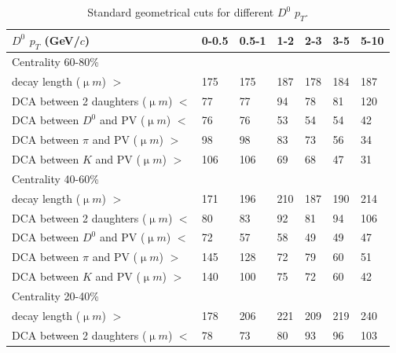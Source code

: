 \begin{table}[htp]
  \centering
  \caption{Standard geometrical cuts for different $D^0$ $p_T$.}
  \label{geometryCuts}
  \begin{center}
    \begin{tabular}{l|l|l|l|l|l|l}
      $D^0$ $p_T$ (GeV/$c$) & 0-0.5 & 0.5-1 & 1-2 & 2-3 & 3-5 & 5-10\\ \hline
      Centrality  60-80\% & &  & &  & & \\ \hline
      decay length (${\upmu}m$) $>$ & 175 & 175 & 187 & 178 & 184 & 187\\ \hline
      DCA between 2 daughters (${\upmu}m$) $<$ & 77 & 77 & 94 & 78 & 81 & 120\\ \hline
      DCA between $D^0$ and PV (${\upmu}m$) $<$ & 76 & 76 & 53 & 54 & 54 & 42\\ \hline
      DCA between $\pi$ and PV (${\upmu}m$) $>$ & 98 & 98 & 83 & 73 & 56 & 34\\ \hline
      DCA between $K$ and PV (${\upmu}m$) $>$ & 106 & 106 & 69 & 68 & 47 & 31\\ \hline
      Centrality  40-60\% &  &  &  &  & & \\ \hline
      decay length (${\upmu}m$) $>$ & 171 & 196 & 210 & 187 & 190 & 214\\ \hline
      DCA between 2 daughters (${\upmu}m$) $<$ & 80 & 83 & 92 & 81 & 94 & 106\\ \hline
      DCA between $D^0$ and PV (${\upmu}m$) $<$ & 72 & 57 & 58 & 49 & 49 & 47\\ \hline
      DCA between $\pi$ and PV (${\upmu}m$) $>$ & 145 & 128 & 72 & 79 & 60 & 51\\ \hline
      DCA between $K$ and PV (${\upmu}m$) $>$ & 140 & 100 & 75 & 72 & 60 & 42\\ \hline
      Centrality  20-40\% &  &  &  &  & & \\ \hline
      decay length (${\upmu}m$) $>$ & 178 & 206 & 221 & 209 & 219 & 240\\ \hline
      DCA between 2 daughters (${\upmu}m$) $<$ & 78 & 73 & 80 & 93 & 96 & 103\\ \hline

\end{tabular}
\end{center}
\end{table}
